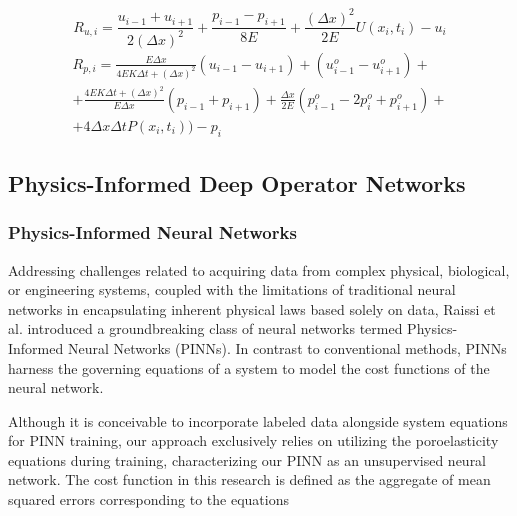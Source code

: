 \documentclass[sn-mathphys]{sn-jnl}%
\theoremstyle{thmstyleone}%
\theoremstyle{thmstyletwo}%
\theoremstyle{thmstylethree}%
\begin{document}
\begin{equation}
\label{eq:residual_numerical_eq_displacement}
R_{u,i} = \frac{u_{i-1}+u_{i+1}}{2(\Delta x)^2} + \frac{p_{i-1}-p_{i+1}}{8E} + \frac{(\Delta x)^2}{2E}U(x_i,t_i) - u_i
\end{equation}
\begin{equation}
\label{eq:residual_numerical_eq_pressure}
\begin{split}
R_{p,i} = \frac{E \Delta x}{4EK \Delta t + (\Delta x)^2}(u_{i-1}-u_{i+1}) + (u^o_{i-1}-u^o_{i+1}) + \\
+ \frac{4EK \Delta t + (\Delta x)^2}{E \Delta x}(p_{i-1} + p_{i+1}) + \frac{\Delta x}{2E}(p^o_{i-1}-2p^o_i+p^o_{i+1}) + \\ + 4\Delta x \Delta tP(x_i,t_i)) - p_i
\end{split}
\end{equation}

\subsection{Physics-Informed Deep Operator Networks}
\subsubsection{Physics-Informed Neural Networks}

Addressing challenges related to acquiring data from complex physical, biological, or engineering systems, coupled with the limitations of traditional neural networks in encapsulating inherent physical laws based solely on data, Raissi et al. \cite{raissi2019physics} introduced a groundbreaking class of neural networks termed Physics-Informed Neural Networks (PINNs). In contrast to conventional methods, PINNs harness the governing equations of a system to model the cost functions of the neural network.

Although it is conceivable to incorporate labeled data alongside system equations for PINN training, our approach exclusively relies on utilizing the poroelasticity equations during training, characterizing our PINN as an unsupervised neural network. The cost function in this research is defined as the aggregate of mean squared errors corresponding to the equations
\end{document}
